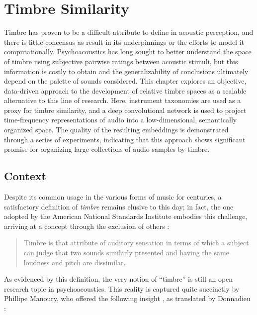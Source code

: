 
\graphicspath{{4/figures/}}

\chapter{Timbre Similarity}
\label{chp:timbre}

Timbre has proven to be a difficult attribute to define in acoustic perception, and there is little concensus as result in its underpinnings or the efforts to model it computationally.
Psychoacoustics has long sought to better understand the space of timbre using subjective pairwise ratings between acoustic stimuli, but this information is costly to obtain and the generalizability of conclusions ultimately depend on the palette of sounds considered.
This chapter explores an objective, data-driven approach to the development of relative timbre spaces as a scalable alternative to this line of research.
Here, instrument taxonomies are used as a proxy for timbre similarity, and a deep convolutional network is used to project time-frequency representations of audio into a low-dimensional, semantically organized space.
The quality of the resulting embeddings is demonstrated through a series of experiments, indicating that this approach shows significant promise for organizing large collections of audio samples by timbre.


\section{Context}
\label{sec:context}

Despite its common usage in the various forms of music for centuries, a satisfactory definition of \emph{timbre} remains elusive to this day; in fact, the one adopted by the American National Standards Institute embodies this challenge, arriving at a concept through the exclusion of others \cite{ANSI1973}:

\begin{quote}
Timbre is that attribute of auditory sensation in terms of which a subject can judge that two sounds similarly presented and having the same loudness and pitch are dissimilar.
\end{quote}

As evidenced by this definition, the very notion of ``timbre'' is still an open research topic in psychoacoustics.
This reality is captured quite succinctly by Phillipe Manoury, who offered the following insight \cite{Manoury1991Limites}, as translated by Donnadieu \cite{Donnadieu2007Mental}:

